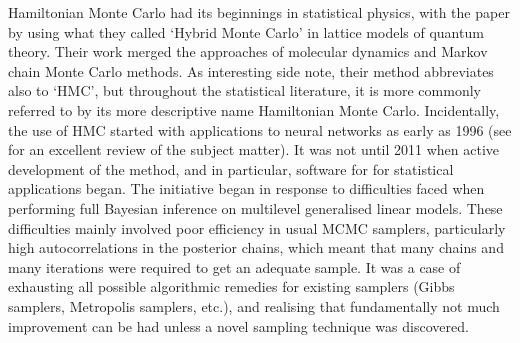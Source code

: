 \label{misc:hmc}

Hamiltonian Monte Carlo had its beginnings in statistical physics, with the \citeyear{duane1987hybrid} paper by \citeauthor{duane1987hybrid} using what they called `Hybrid Monte Carlo' in lattice models of quantum theory.
Their work merged the approaches of molecular dynamics and Markov chain Monte Carlo methods.
As interesting side note, their method abbreviates also to `HMC', but throughout the statistical literature, it is more commonly referred to by its more descriptive name Hamiltonian Monte Carlo.
Incidentally, the use of HMC started with applications to neural networks as early as 1996 (see \citet{neal2011mcmc} for an excellent review of the subject matter).
It was not until 2011 when active development of the method, and in particular, software for for statistical applications began.
The  initiative \citep{carpenter2016stan} began in response to difficulties faced when performing full Bayesian inference on multilevel generalised linear models.
These difficulties mainly involved poor efficiency in usual MCMC samplers, particularly high autocorrelations in the posterior chains, which meant that many chains and many iterations were required to get an adequate sample.
It was a case of exhausting all possible algorithmic remedies for existing samplers (Gibbs samplers, Metropolis samplers, etc.), and realising that fundamentally not much improvement can be had unless a novel sampling technique was discovered.


